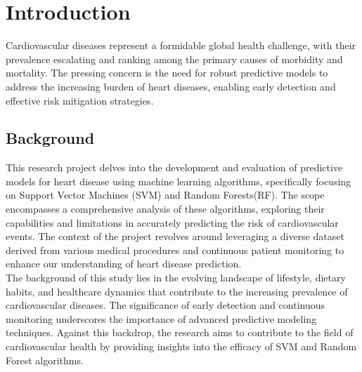 \chapter{Introduction}
\label{ch:into} %

Cardiovascular diseases represent a formidable global health challenge, with their prevalence 
escalating and ranking among the primary causes of morbidity and mortality. The pressing 
concern is the need for robust predictive models to address the increasing burden of heart 
diseases, enabling early detection and effective risk mitigation strategies.
\\


  

\section{Background}
\label{sec:into_back}

This research project delves into the development and 
evaluation of predictive models for heart disease using machine learning algorithms, 
specifically focusing on Support Vector Machines (SVM) and Random Forests(RF). The scope encompasses 
a comprehensive analysis of these algorithms, exploring their capabilities and limitations in 
accurately predicting the risk of cardiovascular events. The context of the project revolves 
around leveraging a diverse dataset derived from various medical procedures and continuous 
patient monitoring to enhance our understanding of heart disease prediction.
\\

The background of this study lies in the evolving landscape of lifestyle, dietary habits, and 
healthcare dynamics that contribute to the increasing prevalence of cardiovascular diseases. 
The significance of early detection and continuous monitoring underscores the importance of 
advanced \cite{toma2023predictive}predictive modeling techniques. Against this backdrop, the research aims to contribute 
to the field of cardiovascular health by providing insights into the efficacy of SVM and Random 
Forest algorithms.

\\



